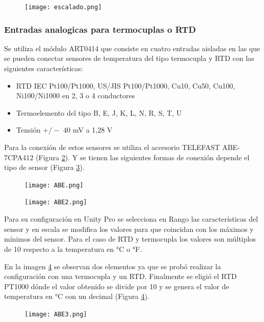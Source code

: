 \begin{figure}[H]
	\centering
	\texttt{[image: escalado.png]}
	\label{fig:escalado}
\end{figure}


\subsubsection{Entradas analogicas para termocuplas o RTD}
Se utiliza el módulo ART0414 que consiste en cuatro entradas aisladas en las que se pueden conectar sensores de temperatura del tipo termocupla y RTD con las siguientes características:
\begin{itemize}
	\item RTD IEC Pt100/Pt1000, US/JIS Pt100/Pt1000, Cu10, Cu50, Cu100, Ni100/Ni1000 en 2, 3 o 4 conductores
	\item Termoelemento del tipo B, E, J, K, L, N, R, S, T, U
\item 	Tensión $+/-$ 40 mV a 1,28 V
	
\end{itemize}

Para la conexión de estos sensores se utiliza el accesorio TELEFAST ABE-7CPA412 (Figura \ref{fig:ABE}). Y se tienen las siguientes formas de conexión depende el tipo de sensor (Figura \ref{fig:ABE2}).

\begin{figure}[H]
	\centering
	\texttt{[image: ABE.png]}
	\label{fig:ABE}
\end{figure}
\begin{figure}[H]
	\centering
	\texttt{[image: ABE2.png]}
	\label{fig:ABE2}
\end{figure}

Para su configuración en Unity Pro se selecciona en Rango las características del sensor y en escala se modifica los valores para que coincidan con los máximos y mínimos del sensor. Para el caso de RTD y termocupla los valores son múltiplos de 10 respecto a la temperatura en °C o °F. 

En la imagen \ref{fig:ABE3} se observan dos elementos ya que se probó realizar la configuración con una termocupla y un RTD. Finalmente se eligió el RTD PT1000 dónde el valor obtenido se divide por 10 y se genera el valor de temperatura en °C con un decimal  (Figura \ref{fig:ABE3}).

\begin{figure}[H]
	\centering
	\texttt{[image: ABE3.png]}
	\label{fig:ABE3}
\end{figure}

